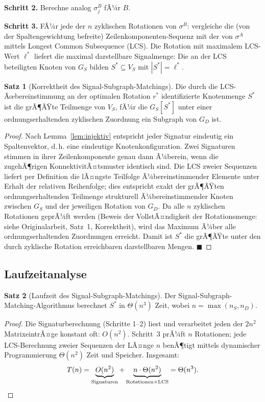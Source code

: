 ﻿\documentclass[a4paper,12pt]{article}
\theoremstyle{definition}
\newtheorem{satz}{Satz}
\begin{document}
\textbf{Schritt 2.} Berechne analog $\sigma_j^B$ fÃ¼r $B$.

\textbf{Schritt 3.} FÃ¼r jede der $n$ zyklischen Rotationen von $\sigma^B$: vergleiche die (von der Spaltengewichtung befreite) Zeilenkomponenten-Sequenz mit der von $\sigma^A$ mittels Longest Common Subsequence (LCS). Die Rotation mit maximalem LCS-Wert $\ell^\ast$ liefert die maximal darstellbare Signalmenge: Die an der LCS beteiligten Knoten von $G_S$ bilden $S^\ast \subseteq V_S$ mit $|S^\ast| = \ell^\ast$.

\begin{satz}[Korrektheit des Signal-Subgraph-Matchings]
\label{satz:korrektheit}
	Die durch die LCS-Ãœbereinstimmung an der optimalen Rotation $r^\ast$ identifizierte Knotenmenge $S^\ast$ ist die grÃ¶ÃŸte Teilmenge von $V_S$, fÃ¼r die $G_S[S^\ast]$ unter einer ordnungserhaltenden zyklischen Zuordnung ein Subgraph von $G_D$ ist.
\end{satz}
\begin{proof}
	Nach Lemma~\ref{lem:injektiv} entspricht jeder Signatur eindeutig ein Spaltenvektor, d.\,h. eine eindeutige Knotenkonfiguration. Zwei Signaturen stimmen in ihrer Zeilenkomponente genau dann Ã¼berein, wenn die zugehÃ¶rigen KonnektivitÃ¤tsmuster identisch sind. Die LCS zweier Sequenzen liefert per Definition die lÃ¤ngste Teilfolge Ã¼bereinstimmender Elemente unter Erhalt der relativen Reihenfolge; dies entspricht exakt der grÃ¶ÃŸten ordnungserhaltenden Teilmenge strukturell Ã¼bereinstimmender Knoten zwischen $G_S$ und der jeweiligen Rotation von $G_D$. Da alle $n$ zyklischen Rotationen geprÃ¼ft werden (Beweis der VollstÃ¤ndigkeit der Rotationsmenge: siehe Originalarbeit, Satz~1, Korrektheit), wird das Maximum Ã¼ber alle ordnungserhaltenden Zuordnungen erreicht. Damit ist $S^\ast$ die grÃ¶ÃŸte unter den durch zyklische Rotation erreichbaren darstellbaren Mengen. $\blacksquare$
\end{proof}

\subsection{Laufzeitanalyse}

\begin{satz}[Laufzeit des Signal-Subgraph-Matchings]
\label{satz:laufzeit}
	Der Signal-Subgraph-Matching-Algorithmus berechnet $S^\ast$ in $\Theta(n^3)$ Zeit, wobei $n = \max(n_S, n_D)$.
\end{satz}
\begin{proof}
	Die Signaturberechnung (Schritte 1--2) liest und verarbeitet jeden der $2n^2$ MatrixeintrÃ¤ge konstant oft: $O(n^2)$. Schritt~3 prÃ¼ft $n$ Rotationen; jede LCS-Berechnung zweier Sequenzen der LÃ¤nge $n$ benÃ¶tigt mittels dynamischer Programmierung $\Theta(n^2)$ Zeit und Speicher. Insgesamt:
	\[
	T(n) = \underbrace{O(n^2)}_{\text{Signaturen}} + \underbrace{n \cdot \Theta(n^2)}_{\text{Rotationen} \times \text{LCS}} = \Theta(n^3). \qedhere
	\]
\end{proof}
\end{document}
